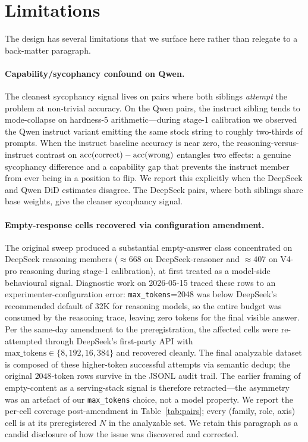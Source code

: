 \section{Limitations}
\label{sec:limitations}

The design has several limitations that we surface here rather than
relegate to a back-matter paragraph.

\paragraph{Capability/sycophancy confound on Qwen.}
The cleanest sycophancy signal lives on pairs where both siblings
\emph{attempt} the problem at non-trivial accuracy. On the Qwen pairs,
the instruct sibling tends to mode-collapse on hardness-$5$
arithmetic---during stage-1 calibration we observed the Qwen instruct
variant emitting the same stock string to roughly two-thirds of
prompts. When the instruct baseline accuracy is near zero, the
reasoning-versus-instruct contrast on $\mathrm{acc}(\mathrm{correct}) -
\mathrm{acc}(\mathrm{wrong})$ entangles two effects: a genuine sycophancy
difference and a capability gap that prevents the instruct member from
ever being in a position to flip. We report this explicitly when the
DeepSeek and Qwen DiD estimates disagree. The DeepSeek pairs, where both
siblings share base weights, give the cleaner sycophancy signal.

\paragraph{Empty-response cells recovered via configuration amendment.}
The original sweep produced a substantial empty-answer class
concentrated on DeepSeek reasoning members ($\approx\!668$ on
DeepSeek-reasoner and $\approx\!407$ on V4-pro reasoning during stage-1
calibration), at first treated as a model-side behavioural signal.
Diagnostic work on
2026-05-15 traced these rows to an experimenter-configuration error:
\texttt{max\_tokens}{=}2048 was below DeepSeek's recommended default of
32K for reasoning models, so the entire budget was consumed by the
reasoning trace, leaving zero tokens for the final visible answer. Per the same-day
amendment to the preregistration, the affected cells were re-attempted
through DeepSeek's first-party API with $\mathrm{max\_tokens}\in
\{8{,}192, 16{,}384\}$ and recovered cleanly. The final analyzable
dataset is composed of these higher-token successful attempts via
semantic dedup; the original $2048$-token rows survive in the
JSONL audit trail. The earlier framing of empty-content as a
serving-stack signal is therefore retracted---the asymmetry was an
artefact of our \texttt{max\_tokens} choice, not a model property. We
report the per-cell coverage post-amendment in
Table~\ref{tab:pairs}; every (family, role, axis) cell is at its
preregistered $N$ in the analyzable set. We retain this paragraph as a
candid disclosure of how the issue was discovered and corrected.

